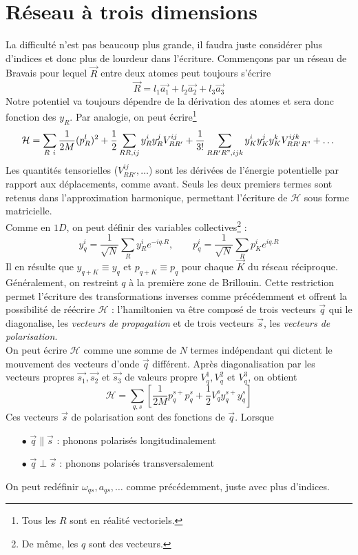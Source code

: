 \section{Réseau à trois dimensions}
La difficulté n'est pas beaucoup plus grande, il faudra juste considérer 
plus d'indices et donc plus de lourdeur dans l'écriture. Commençons par un 
réseau de Bravais pour lequel $\vec{R}$ entre deux atomes peut toujours 
s'écrire
\begin{equation}
\vec{R} = l_1\vec{a_1}+l_2\vec{a_2}+l_3\vec{a_3}
\end{equation}
Notre potentiel va toujours dépendre de la dérivation des atomes et sera 
donc fonction des $y_R$. Par analogie, on peut écrire\footnote{Tous les 
$R$ sont en réalité vectoriels.}
\begin{equation}
\mathcal{H} = \sum_{R\ i} \frac{1}{2M}(p_R^l)^2 + \frac{1}{2}\sum_{RR, ij}
y_R^iy_R^jV_{RR'}^{ij} + \dfrac{1}{3!}\sum_{RR'R",ijk} y_K^iy_K^j y_K^k 
V_{RR'R"}^{ijk} + \dots
\end{equation}
Les quantités tensorielles ($V_{RR'}^{ij},\dots$) sont les dérivées de 
l'énergie potentielle par rapport aux déplacements, comme avant. Seuls les 
deux premiers termes sont retenus dans l'approximation harmonique, 
permettant l'écriture de $\mathcal{H}$ sous forme matricielle.\\
Comme en $1D$, on peut définir des variables collectives\footnote{De même, 
les $q$ sont des vecteurs.} :
\begin{equation}
y_q^i= \dfrac{1}{\sqrt{N}}\sum_R y_R^i e^{-iq.R},\qquad p_q^i = \frac{1}{
\sqrt{N}}\sum_R p_K^i e^{iq.R}
\end{equation}
Il en résulte que $y_{q+K} \equiv y_q$ et $p_{q+K} \equiv p_q$ pour chaque 
$\vec{K}$ du réseau réciproque. Généralement, on restreint $q$ à la première 
zone de Brillouin. Cette restriction permet l'écriture des transformations 
inverses comme précédemment et offrent la possibilité de réécrire 
$\mathcal{H}$ : l'hamiltonien va être composé de trois vecteurs $\vec{q}$ 
qui le diagonalise, les \textit{vecteurs de propagation} et de trois 
vecteurs $\vec{s}$, les \textit{vecteurs de polarisation}.\\

On peut écrire $\mathcal{H}$ comme une somme de $N$ termes indépendant qui 
dictent le mouvement des vecteurs d'onde $\vec{q}$ différent. Après 
diagonalisation par les vecteurs propres $\vec{s_1},\vec{s_2}$ et $\vec{s_3}$
de valeurs propre $V_q^1, V_q^2$ et $V_q^3$, on obtient
\begin{equation}
\mathcal{H} = \sum_{q,s} \left[\dfrac{1}{2M}p_q^{s+}p_q^s + \dfrac{1}{2}V_q^s
y_q^{s+}y_q^s\right]
\end{equation}
Ces vecteurs $\vec s$ de polarisation sont des fonctions de $\vec{q}$. Lorsque
\begin{itemize}
\item[$\bullet$] $\vec{q}\parallel \vec{s}$ : phonons polarisés 
longitudinalement
\item[$\bullet$] $\vec{q}\perp\vec{s}$ : phonons polarisés 
transversalement
\end{itemize}
On peut redéfinir $\omega_{qs}, a_{qs},\dots$ comme précédemment, juste avec 
plus d'indices.

